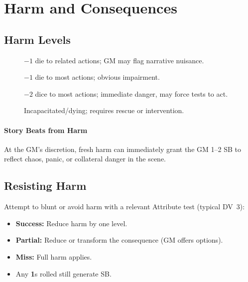 \section{Harm and Consequences}
\label{sec:harm-consequences}

\subsection{Harm Levels}
\label{subsec:harm-levels}

\begin{description}
  \item[] $-1$ die to related actions; GM may flag narrative nuisance. 
  \item[] $-1$ die to most actions; obvious impairment. 
  \item[] $-2$ dice to most actions; immediate danger, may force tests to act. 
  \item[] Incapacitated/dying; requires rescue or intervention. 
\end{description}

\paragraph{Story Beats from Harm}
At the GM’s discretion, fresh harm can immediately grant the GM 1--2 SB to reflect chaos, panic, or collateral danger in the scene.

\subsection{Resisting Harm}
\label{subsec:resisting-harm}

Attempt to blunt or avoid harm with a relevant Attribute test (typical DV~3):
\begin{itemize}
  \item \textbf{Success:} Reduce harm by one level.
  \item \textbf{Partial:} Reduce or transform the consequence (GM offers options).
  \item \textbf{Miss:} Full harm applies.
  \item Any \textbf{1}s rolled still generate SB. 
\end{itemize}

